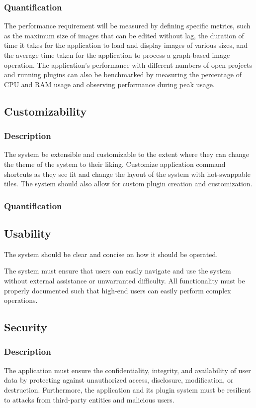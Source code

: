 \documentclass[11pt,a4paper]{article}
\begin{document}
\subsubsection*{Quantification}
The performance requirement will be measured by defining specific metrics, such
as the maximum size of images that can be edited without lag, the duration of
time it takes for the application to load and display images of various sizes,
and the average time taken for the application to process a graph-based image
operation. The application's performance with different numbers of open projects
and running plugins can also be benchmarked by measuring the percentage of CPU
and RAM usage and observing performance during peak usage.


\subsection{Customizability}
\subsubsection*{Description}
The system be extensible and customizable to the extent where they can change
the theme of the system to their liking. Customize application command shortcuts
as they see fit and change the layout of the system with hot-swappable tiles.
The system should also allow for custom plugin creation and customization.

\subsubsection*{Quantification}

\subsection{Usability} 
The system should be clear and concise on how it should be operated. 

The system must ensure that users can easily navigate and use the system without
external assistance or unwarranted difficulty. All functionality must be
properly documented such that high-end users can easily perform complex
operations.

\subsection{Security} 

\subsubsection*{Description}
The application must ensure the confidentiality, integrity, and availability of
user data by protecting against unauthorized access, disclosure, modification,
or destruction. Furthermore, the application and its plugin system must be
resilient to attacks from third-party entities and malicious users.
\end{document}
